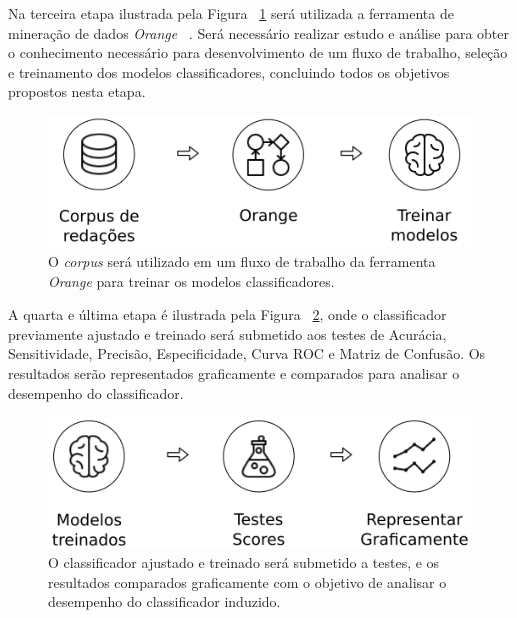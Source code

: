 Na terceira etapa ilustrada pela Figura ~\ref{fig:metodologia_3} será utilizada a ferramenta de mineração de dados \textit{Orange} ~\cite{JMLR:demsar13a}. Será necessário realizar estudo e análise para obter o conhecimento necessário para desenvolvimento de um fluxo de trabalho, seleção e treinamento dos modelos classificadores, concluindo todos os objetivos propostos nesta etapa.

\begin{figure}[H]
\begin{center}
    \includegraphics[scale=0.75]{figuras/metodologia_3.png}
\end{center}
\caption{O \textit{corpus} será utilizado em um fluxo de trabalho da ferramenta \textit{Orange} para treinar os modelos classificadores.}
\label{fig:metodologia_3}
\end{figure}

A quarta e última etapa é ilustrada pela Figura ~\ref{fig:metodologia_4}, onde o classificador previamente ajustado e treinado será submetido aos testes de Acurácia, Sensitividade, Precisão, Especificidade, Curva ROC e Matriz de Confusão. Os resultados serão representados graficamente e comparados para analisar o desempenho do classificador.
\begin{figure}[H]
\begin{center}
    \includegraphics[scale=0.75]{figuras/metodologia_4.png}
\end{center}
\caption{O classificador ajustado e treinado será submetido a testes, e os resultados comparados graficamente com o objetivo de analisar o desempenho do classificador induzido.}
\label{fig:metodologia_4}
\end{figure}
